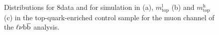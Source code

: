 \begin{figure}[!htb]
\centering
{}\\
\caption{Distributions for 8\TeV data and for simulation in \mWH (a), $m_\mathrm{top}^\mathrm{l}$ (b) and $m_\mathrm{top}^\mathrm{h}$ (c) in the top-quark-enriched control sample for the muon channel of the $\ell\nu{\mathrm{b}\overline{\mathrm{b}}}$ analysis.}
\label{fig:tt-mtop8TeV}
\end{figure}
